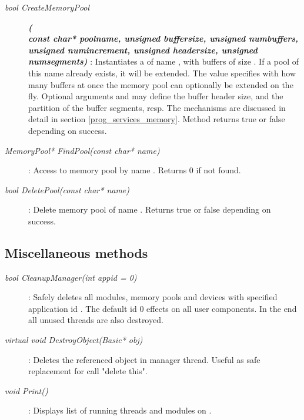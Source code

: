 \begin{description}	

\item[\em bool CreateMemoryPool] {\small \bf\em (} \\
{\small \bf\em const char* poolname, unsigned buffersize, unsigned numbuffers, \\
          unsigned numincrement, unsigned headersize, unsigned numsegments)} : 
Instantiates a  of name , 
with  buffers of size .
If a pool of this name already exists, it will be extended.
The  value specifies with how many buffers at once the memory pool 
can optionally be extended on the fly.
Optional arguments  and  may
define the buffer header size, and the partition of the buffer segments, resp.         
The  mechanisms are discussed in detail in 
section \ref{prog_services_memory}.
Method returns true or false depending on success.	

\item[\em MemoryPool* FindPool\small (const char* name)] :
Access to memory pool by name . Returns 0 if not found.

\item[\em bool DeletePool\small (const char* name)] :
Delete memory pool of name . Returns true or false depending on success.
   
\end{description}
	 

\subsection{Miscellaneous methods}
	 
\begin{description}	
 
\item[\em bool CleanupManager\small (int appid = 0) ] :
Safely deletes all modules, memory pools and devices with
specified application id . The default id 0 effects 
on all user components. In the end all unused threads are also 
destroyed. 
 
\item[\em virtual void DestroyObject\small (Basic* obj)] :
Deletes the referenced object  in manager thread.
Useful as safe replacement for call "delete this".

\item[\em void Print()] :
Displays list of running threads and modules on .


\end{description}




